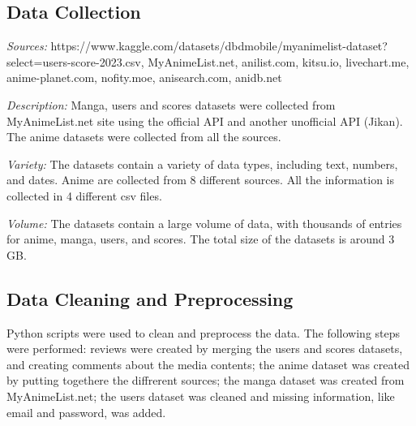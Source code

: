 \subsection{Data Collection}
\textit{Sources:} https://www.kaggle.com/datasets/dbdmobile/myanimelist-dataset?select=users-score-2023.csv, MyAnimeList.net,	anilist.com,  kitsu.io,			  livechart.me,
anime-planet.com,		nofity.moe,	   anisearch.com,		  anidb.net 	

\textit{Description:} Manga, users and scores datasets were collected from MyAnimeList.net site using the official API and another unofficial API (Jikan). The anime datasets were collected from all the sources. 

\textit{Variety:} The datasets contain a variety of data types, including text, numbers, and dates. Anime are collected from 8 different sources. All the information is collected in 4 different csv files.

\textit{Volume:} The datasets contain a large volume of data, with thousands of entries for anime, manga, users, and scores. The total size of the datasets is around 3 GB.

\subsection{Data Cleaning and Preprocessing}
Python scripts were used to clean and preprocess the data. The following steps were performed:
reviews were created by merging the users and scores datasets, and creating comments about the media contents;
the anime dataset was created by putting togethere the diffrerent sources;
the manga dataset was created from MyAnimeList.net;
the users dataset was cleaned and missing information, like email and password, was added.

